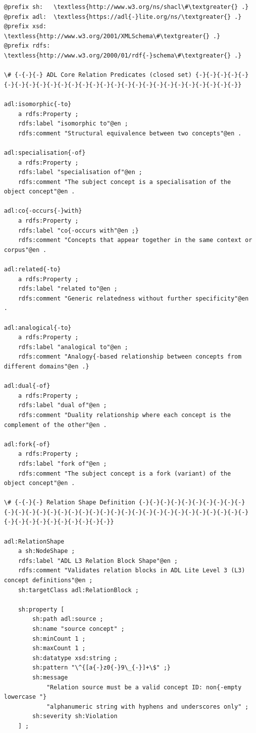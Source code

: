 \begin{lstlisting}
@prefix sh:   \textless{http://www.w3.org/ns/shacl\#\textgreater{} .}
@prefix adl:  \textless{https://adl{-}lite.org/ns/\textgreater{} .}
@prefix xsd:  \textless{http://www.w3.org/2001/XMLSchema\#\textgreater{} .}
@prefix rdfs: \textless{http://www.w3.org/2000/01/rdf{-}schema\#\textgreater{} .}

\# {-{-}{-} ADL Core Relation Predicates (closed set) {-}{-}{-}{-}{-}{-}{-}{-}{-}{-}{-}{-}{-}{-}{-}{-}{-}{-}{-}{-}{-}{-}{-}{-}{-}{-}{-}}

adl:isomorphic{-to}
    a rdfs:Property ;
    rdfs:label "isomorphic to"@en ;
    rdfs:comment "Structural equivalence between two concepts"@en .

adl:specialisation{-of}
    a rdfs:Property ;
    rdfs:label "specialisation of"@en ;
    rdfs:comment "The subject concept is a specialisation of the object concept"@en .

adl:co{-occurs{-}with}
    a rdfs:Property ;
    rdfs:label "co{-occurs with"@en ;}
    rdfs:comment "Concepts that appear together in the same context or corpus"@en .

adl:related{-to}
    a rdfs:Property ;
    rdfs:label "related to"@en ;
    rdfs:comment "Generic relatedness without further specificity"@en .

adl:analogical{-to}
    a rdfs:Property ;
    rdfs:label "analogical to"@en ;
    rdfs:comment "Analogy{-based relationship between concepts from different domains"@en .}

adl:dual{-of}
    a rdfs:Property ;
    rdfs:label "dual of"@en ;
    rdfs:comment "Duality relationship where each concept is the complement of the other"@en .

adl:fork{-of}
    a rdfs:Property ;
    rdfs:label "fork of"@en ;
    rdfs:comment "The subject concept is a fork (variant) of the object concept"@en .

\# {-{-}{-} Relation Shape Definition {-}{-}{-}{-}{-}{-}{-}{-}{-}{-}{-}{-}{-}{-}{-}{-}{-}{-}{-}{-}{-}{-}{-}{-}{-}{-}{-}{-}{-}{-}{-}{-}{-}{-}{-}{-}{-}{-}{-}{-}{-}{-}{-}}

adl:RelationShape
    a sh:NodeShape ;
    rdfs:label "ADL L3 Relation Block Shape"@en ;
    rdfs:comment "Validates relation blocks in ADL Lite Level 3 (L3) concept definitions"@en ;
    sh:targetClass adl:RelationBlock ;

    sh:property [
        sh:path adl:source ;
        sh:name "source concept" ;
        sh:minCount 1 ;
        sh:maxCount 1 ;
        sh:datatype xsd:string ;
        sh:pattern "\^{[a{-}z0{-}9\_{-}]+\$" ;}
        sh:message
            "Relation source must be a valid concept ID: non{-empty lowercase "}
            "alphanumeric string with hyphens and underscores only" ;
        sh:severity sh:Violation
    ] ;


\end{lstlisting}

